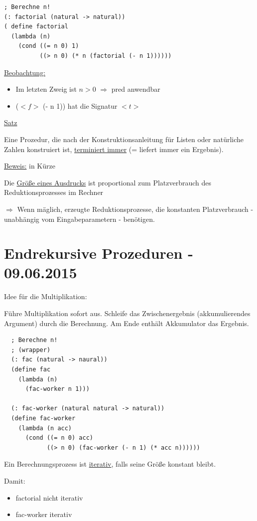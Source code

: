 \documentclass[a4paper, 20pt, openany]{book}
\begin{document}
\begin{lstlisting}
; Berechne n! 
(: factorial (natural -> natural)) 
( define factorial 
  (lambda (n)  
    (cond ((= n 0) 1) 
          ((> n 0) (* n (factorial (- n 1)))))) 
\end{lstlisting}

\underline{Beobachtung:}

\begin{itemize}
  \item Im letzten Zweig ist $n>0$ $\Rightarrow$ pred anwendbar 
  \item ($<f>$ (- n 1)) hat die Signatur $<t>$
\end{itemize}

\underline{Satz}

Eine Prozedur, die nach der Konstruktionsanleitung für Listen oder natürliche Zahlen konstruiert ist, \underline{terminiert immer} (= liefert immer ein Ergebnis).

\underline{Beweis:} in Kürze

Die \underline{Größe eines Ausdrucks} ist proportional zum Platzverbrauch des Reduktionsprozesses im Rechner

$\Rightarrow$ Wenn mäglich, erzeugte Reduktionsprozesse, die konstanten Platzverbrauch - unabhängig vom Eingabeparametern - benötigen.

\chapter{Endrekursive Prozeduren - 09.06.2015}
Idee für die Multiplikation:

Führe Multiplikation sofort aus. Schleife das Zwischenergebnis (akkumulierendes Argument) durch die Berechnung. Am Ende enthält Akkumulator das Ergebnis.

\begin{lstlisting}
  ; Berechne n!
  ; (wrapper)
  (: fac (natural -> naural))
  (define fac
    (lambda (n)
      (fac-worker n 1)))
      
  (: fac-worker (natural natural -> natural))
  (define fac-worker
    (lambda (n acc)
      (cond ((= n 0) acc)
            ((> n 0) (fac-worker (- n 1) (* acc n))))))
\end{lstlisting}

Ein Berechnungsprozess ist \underline{iterativ}, falls seine Größe konstant bleibt.

Damit:

\begin{itemize}
  \item factorial nicht iterativ 
  \item fac-worker iterativ
\end{itemize}
\end{document}
